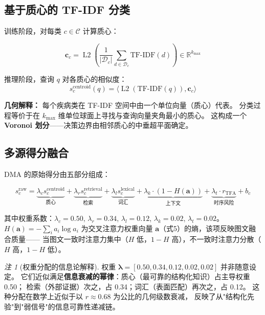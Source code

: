 \documentclass[11pt,a4paper]{ctexart}
\theoremstyle{remark}
\newtheorem{remark}{注}[section]
\DeclareMathOperator{\Ltwo}{L2}
\begin{document}
\subsection{基于质心的 TF-IDF 分类}

训练阶段，对每类 $c \in \mathcal{C}$ 计算质心：

\begin{equation}
\mathbf{c}_c = \Ltwo\left(\frac{1}{|\mathcal{D}_c|}\sum_{d \in \mathcal{D}_c} \text{TF-IDF}(d)\right) \in \mathbb{R}^{k_{\max}}
\end{equation}

推理阶段，查询 $q$ 对各质心的相似度：
\begin{equation}
s_c^{\text{centroid}}(q) = \langle \Ltwo(\text{TF-IDF}(q)), \mathbf{c}_c \rangle
\end{equation}

\textbf{几何解释：} 每个疾病类在 TF-IDF 空间中由一个单位向量（质心）代表。
分类过程等价于在 $k_{\max}$ 维单位球面上寻找与查询向量夹角最小的质心。
这构成一个\textbf{Voronoi 划分}——决策边界由相邻质心的中垂超平面确定。

\subsection{多源得分融合}

DMA 的原始得分由五部分组成：

\begin{equation}
s_c^{\text{raw}} = \underbrace{\lambda_c s_c^{\text{centroid}}}_{\text{质心}} + \underbrace{\lambda_r s_c^{\text{retrieval}}}_{\text{检索}} + \underbrace{\lambda_l s_c^{\text{lexical}}}_{\text{词汇}} + \underbrace{\lambda_k \cdot (1 - H(\mathbf{a}))}_{\text{上下文}} + \underbrace{\lambda_t \cdot r_{\text{TFA}}}_{\text{时序风险}} + b_c
\label{eq:dma_raw}
\end{equation}

其中权重系数：$\lambda_c=0.50$, $\lambda_r=0.34$, $\lambda_l=0.12$, $\lambda_k=0.02$, $\lambda_t=0.02$。
$H(\mathbf{a}) = -\sum_i a_i \log a_i$ 为交叉注意力权重向量 $\mathbf{a}$（式5）的熵，该项反映图文融合质量——
当图文一致时注意力集中（$H$ 低，$1-H$ 高），不一致时注意力分散（$H$ 高，$1-H$ 低）。

\begin{remark}[权重分配的信息论解释]
权重 $\boldsymbol{\lambda} = [0.50, 0.34, 0.12, 0.02, 0.02]$ 并非随意设定。
它们近似满足\textbf{信息衰减的幂律}：质心（最可靠的结构化知识）占主导权重 0.50；
检索（外部证据）次之，占 0.34；词汇（表面匹配）再次之，占 0.12。
这种分配在数学上近似于以 $r \approx 0.68$ 为公比的几何级数衰减，
反映了从"结构化先验"到"弱信号"的信息可靠性递减链。
\end{remark}
\end{document}
